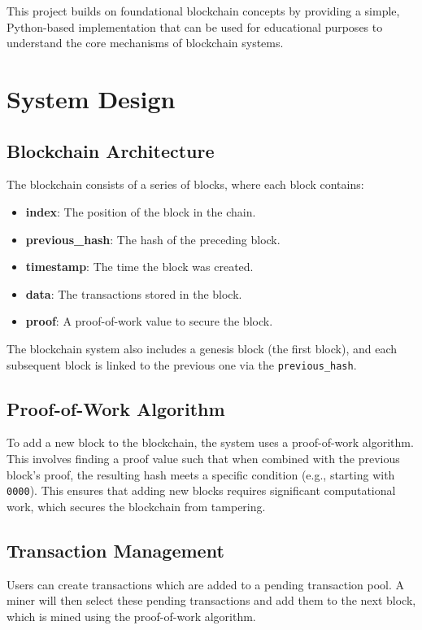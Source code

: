 \documentclass[sigconf]{acmart}
\begin{document}
This project builds on foundational blockchain concepts by providing a simple, Python-based implementation that can be used for educational purposes to understand the core mechanisms of blockchain systems.

\section{System Design}

\subsection{Blockchain Architecture}
The blockchain consists of a series of blocks, where each block contains:
\begin{itemize}
    \item \textbf{index}: The position of the block in the chain.
    \item \textbf{previous\_hash}: The hash of the preceding block.
    \item \textbf{timestamp}: The time the block was created.
    \item \textbf{data}: The transactions stored in the block.
    \item \textbf{proof}: A proof-of-work value to secure the block.
\end{itemize}
The blockchain system also includes a genesis block (the first block), and each subsequent block is linked to the previous one via the \texttt{previous\_hash}.

\subsection{Proof-of-Work Algorithm}
To add a new block to the blockchain, the system uses a proof-of-work algorithm. This involves finding a proof value such that when combined with the previous block's proof, the resulting hash meets a specific condition (e.g., starting with \texttt{0000}). This ensures that adding new blocks requires significant computational work, which secures the blockchain from tampering.

\subsection{Transaction Management}
Users can create transactions which are added to a pending transaction pool. A miner will then select these pending transactions and add them to the next block, which is mined using the proof-of-work algorithm.
\end{document}
